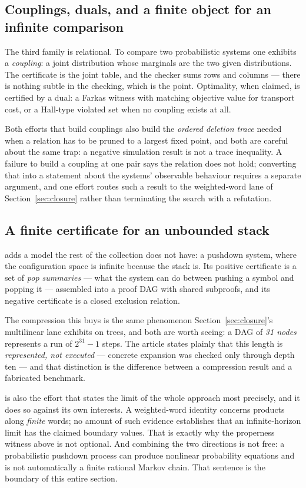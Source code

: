 \subsection{Couplings, duals, and a finite object for an infinite comparison}

The third family is relational. To compare two probabilistic systems one
exhibits a \emph{coupling}: a joint distribution whose marginals are the two
given distributions. The certificate is the joint table, and the checker sums
rows and columns --- there is nothing subtle in the checking, which is the
point. Optimality, when claimed, is certified by a dual: a Farkas witness with
matching objective value for transport cost, or a Hall-type violated set when
no coupling exists at all.

Both efforts that build couplings also build the \emph{ordered deletion trace}
needed when a relation has to be pruned to a largest fixed point, and both are
careful about the same trap: a negative simulation result is not a trace
inequality. A failure to build a coupling at one pair says the relation does
not hold; converting that into a statement about the systems' observable
behaviour requires a separate argument, and one effort routes such a result to
the weighted-word lane of Section~\ref{sec:closure} rather than terminating the
search with a refutation.

\subsection{A finite certificate for an unbounded stack}

 adds a model the rest of the collection does not have: a pushdown
system, where the configuration space is infinite because the stack is. Its
positive certificate is a set of \emph{pop summaries} --- what the system can do
between pushing a symbol and popping it --- assembled into a proof DAG with
shared subproofs, and its negative certificate is a closed exclusion relation.

The compression this buys is the same phenomenon Section~\ref{sec:closure}'s
multilinear lane exhibits on trees, and both are worth seeing: a DAG of
\emph{31 nodes} represents a run of $2^{31}-1$ steps. The article states plainly
that this length is \emph{represented, not executed} --- concrete expansion was
checked only through depth ten --- and that distinction is the difference
between a compression result and a fabricated benchmark.

\begin{remark}
 is also the effort that states the limit of the whole approach most
precisely, and it does so against its own interests. A weighted-word identity
concerns products along \emph{finite} words; no amount of such evidence
establishes that an infinite-horizon limit has the claimed boundary values.
That is exactly why the properness witness above is not optional. And combining
the two directions is not free: a probabilistic pushdown process can produce
nonlinear probability equations and is not automatically a finite rational
Markov chain. That sentence is the boundary of this entire section.
\end{remark}

